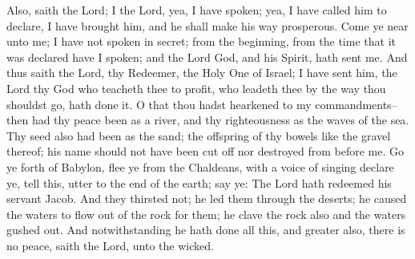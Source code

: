 Also, saith the Lord; I the Lord, yea, I have spoken; yea, I have called him to declare, I have brought him, and he shall make his way prosperous.
\bverse \iffalse Come ye near unto me; I have not spoken in secret; from the beginning, from the time that it was declared have I spoken; and the Lord God, and his Spirit, hath sent me. \fi
Come ye near unto me; I have not spoken in secret; from the beginning, from the time that it was declared have I spoken; and the Lord God, and his Spirit, hath sent me.
\bverse \iffalse And thus saith the Lord, thy Redeemer, the Holy One of Israel; I have sent him, the Lord thy God who teacheth thee to profit, who leadeth thee by the way thou shouldst go, hath done it. \fi
And thus saith the Lord, thy Redeemer, the Holy One of Israel; I have sent him, the Lord thy God who teacheth thee to profit, who leadeth thee by the way thou shouldst go, hath done it.
\bverse \iffalse O that thou hadst hearkened to my commandments--then had thy peace been as a river, and thy righteousness as the waves of the sea. \fi
O that thou hadst hearkened to my commandments--then had thy peace been as a river, and thy righteousness as the waves of the sea.
\bverse \iffalse Thy seed also had been as the sand; the offspring of thy bowels like the gravel thereof; his name should not have been cut off nor destroyed from before me. \fi
Thy seed also had been as the sand; the offspring of thy bowels like the gravel thereof; his name should not have been cut off nor destroyed from before me.
\bverse \iffalse Go ye forth of Babylon, flee ye from the Chaldeans, with a voice of singing declare ye, tell this, utter to the end of the earth; say ye: The Lord hath redeemed his servant Jacob. \fi
Go ye forth of Babylon, flee ye from the Chaldeans, with a voice of singing declare ye, tell this, utter to the end of the earth; say ye: The Lord hath redeemed his servant Jacob.
\bverse \iffalse And they thirsted not; he led them through the deserts; he caused the waters to flow out of the rock for them; he clave the rock also and the waters gushed out. \fi
And they thirsted not; he led them through the deserts; he caused the waters to flow out of the rock for them; he clave the rock also and the waters gushed out.
\bverse \iffalse And notwithstanding he hath done all this, and greater also, there is no peace, saith the Lord, unto the wicked. \fi
And notwithstanding he hath done all this, and greater also, there is no peace, saith the Lord, unto the wicked.

